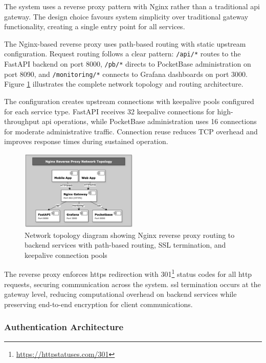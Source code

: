 The system uses a reverse proxy pattern with Nginx rather than a traditional \ac{api} gateway. The design choice favours system simplicity over traditional gateway functionality, creating a single entry point for all services.

The Nginx-based reverse proxy uses path-based routing with static upstream configuration. Request routing follows a clear pattern: \texttt{/api/*} routes to the FastAPI backend on port 8000, \texttt{/pb/*} directs to PocketBase administration on port 8090, and \texttt{/monitoring/*} connects to Grafana dashboards on port 3000. Figure \ref{fig:network_topology} illustrates the complete network topology and routing architecture.

The configuration creates upstream connections with keepalive pools configured for each service type. FastAPI receives 32 keepalive connections for high-throughput \ac{api} operations, while PocketBase administration uses 16 connections for moderate administrative traffic. Connection reuse reduces TCP overhead and improves response times during sustained operation.

\begin{figure}[htbp]
    \centering
    \includegraphics[width=0.5\textwidth]{figs/chapter4/network_topology.png}
    \caption{Network topology diagram showing Nginx reverse proxy routing to backend services with path-based routing, SSL termination, and keepalive connection pools}
    \label{fig:network_topology}
\end{figure}

The reverse proxy enforces \ac{https} redirection with 301\footnote{\url{https://httpstatuses.com/301}} status codes for all \ac{http} requests, securing communication across the system. \ac{ssl} termination occurs at the gateway level, reducing computational overhead on backend services while preserving end-to-end encryption for client communications.

\subsubsection{Authentication Architecture} \label{subsubsection:auth_authorization}

